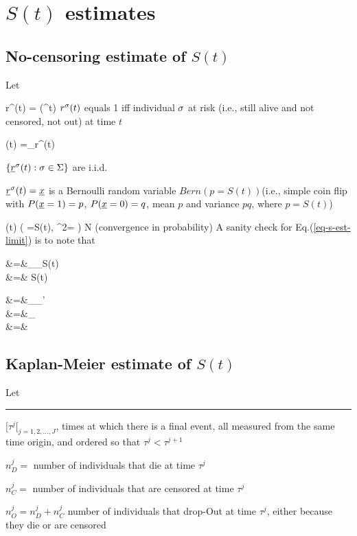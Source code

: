 \section{$S(t)$ estimates}

\subsection{No-censoring estimate of $S(t)$}

Let


\beq
r^\s(t) =  \indi(\tau^\s\geq t)
\eeq
$r^\sigma(t)$ equals 1 iff individual $\sigma$
at risk (i.e., still alive
and not censored, not out) at time $t$

\beq
{}(t) =\sum_\s r^\s(t)
\eeq

$\{{\underline{r}}^\sigma(t):\sigma\in\Sigma\}$ are i.i.d.

${\underline{r}}^\sigma(t)={\underline{x}}$ is
a Bernoulli random variable $Bern(p=S(t))$(i.e.,
simple coin flip with $P({\underline{x}}=1)=p$, $P({\underline{x}}=0)=q$,
mean $p$ and variance $pq$, where $p=S(t)$)

\beq
{}(t)\rarrow
\caln\left(
\mu =S(t), \s^2= \right)
N\rarrow \infty
\label{eq-s-est-limit}
\eeq
 (convergence in probability)
A sanity check for Eq.(\ref{eq-s-est-limit}) is to note that

\beqa
{}
&=&\sum_\s {}_{S(t)}
\\
&=&
S(t)
\eeqa


\beqa
{}
&=&\sum_\s \sum_{\s'}
\\
&=&\sum_\s
{}
\\
&=&
\eeqa

\subsection{Kaplan-Meier estimate of $S(t)$}
Let
\hrule
$[\tau^j[_{j=1,2, \ldots, J}$, times at
which there is a final event, all measured
from the same time origin, and
ordered so that $\tau^j < \tau^{j+1}$

$n_D^j=$ number of individuals
that die  at time $\tau^j$


$n_C^j=$ number of individuals
that are censored at time $\tau^j$


$n_O^j=n_D^j+n_C^j$ number of individuals that drop-Out
at time $\tau^j$, either
because they die or are censored



